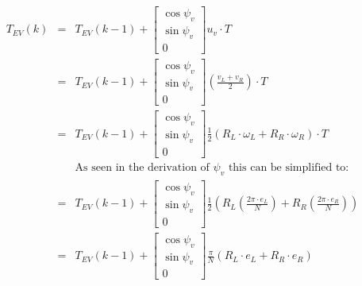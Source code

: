 \documentclass[12pt]{article}
\begin{document}
	\begin{eqnarray}
	{T}_{EV}(k) &=& {T}_{EV}(k-1) + \left[
	\begin{array}{c}
	\cos \psi_v\\
	\sin \psi_v \\
	0
	\end{array}
	\right] u_v \cdot T \nonumber \\
	&=& {T}_{EV}(k-1) + \left[
	\begin{array}{c}
	\cos \psi_v\\
	\sin \psi_v \\
	0
	\end{array}
	\right] \left( \frac{v_L + v_R}{2} \right) \cdot T \nonumber \\
	&=& {T}_{EV}(k-1) + \left[
	\begin{array}{c}
	\cos \psi_v\\
	\sin \psi_v \\
	0
	\end{array}
	\right] \frac{1}{2}(R_L\cdot\omega_L + R_R\cdot\omega_R)\cdot T \nonumber \nonumber \\
	&& \text{As seen in the derivation of $\psi_v$ this can be simplified to:}	\nonumber \\
	&=& {T}_{EV}(k-1) + \left[
	\begin{array}{c}
	\cos \psi_v\\
	\sin \psi_v \\
	0
	\end{array}
	\right] \frac{1}{2}\left(R_L\left(\frac{2\pi \cdot e_L}{N}\right) + R_R\left(\frac{2\pi \cdot e_R}{N}\right)\right) \nonumber  \\
	&=& {T}_{EV}(k-1) + \left[
	\begin{array}{c}
	\cos \psi_v\\
	\sin \psi_v \\
	0
	\end{array}
	\right] \frac{\pi}{N}(R_L\cdot e_L + R_R\cdot e_R) \\
	\nonumber \end{eqnarray}
	
	 
\end{document}
